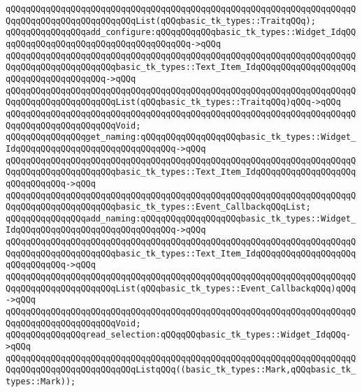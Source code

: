 \verb|qQQqqQQqqQQqqQQqqQQqqQQqqQQqqQQqqQQqqQQqqQQqqQQqqQQqqQQqqQQqqQQqqQQqqQQqqQQqqQQqqQQqqQQqqQQqqQQqList(qQQqbasic_tk_types::TraitqQQq);|\newline
\verb|qQQqqQQqqQQqqQQqadd_configure:qQQqqQQqqQQqbasic_tk_types::Widget_IdqQQqqQQqqQQqqQQqqQQqqQQqqQQqqQQqqQQqqQQq->qQQq|\newline
\verb|qQQqqQQqqQQqqQQqqQQqqQQqqQQqqQQqqQQqqQQqqQQqqQQqqQQqqQQqqQQqqQQqqQQqqQQqqQQqqQQqqQQqqQQqqQQqbasic_tk_types::Text_Item_IdqQQqqQQqqQQqqQQqqQQqqQQqqQQqqQQqqQQqqQQq->qQQq|\newline
\verb|qQQqqQQqqQQqqQQqqQQqqQQqqQQqqQQqqQQqqQQqqQQqqQQqqQQqqQQqqQQqqQQqqQQqqQQqqQQqqQQqqQQqqQQqqQQqList(qQQqbasic_tk_types::TraitqQQq)qQQq->qQQq|\newline
\verb|qQQqqQQqqQQqqQQqqQQqqQQqqQQqqQQqqQQqqQQqqQQqqQQqqQQqqQQqqQQqqQQqqQQqqQQqqQQqqQQqqQQqqQQqqQQqVoid;|\newline
\newline
\verb|qQQqqQQqqQQqqQQqget_naming:qQQqqQQqqQQqqQQqqQQqbasic_tk_types::Widget_IdqQQqqQQqqQQqqQQqqQQqqQQqqQQqqQQq->qQQq|\newline
\verb|qQQqqQQqqQQqqQQqqQQqqQQqqQQqqQQqqQQqqQQqqQQqqQQqqQQqqQQqqQQqqQQqqQQqqQQqqQQqqQQqqQQqqQQqqQQqbasic_tk_types::Text_Item_IdqQQqqQQqqQQqqQQqqQQqqQQqqQQqqQQq->qQQq|\newline
\verb|qQQqqQQqqQQqqQQqqQQqqQQqqQQqqQQqqQQqqQQqqQQqqQQqqQQqqQQqqQQqqQQqqQQqqQQqqQQqqQQqqQQqqQQqqQQqbasic_tk_types::Event_CallbackqQQqList;|\newline
\verb|qQQqqQQqqQQqqQQqadd_naming:qQQqqQQqqQQqqQQqqQQqbasic_tk_types::Widget_IdqQQqqQQqqQQqqQQqqQQqqQQqqQQqqQQq->qQQq|\newline
\verb|qQQqqQQqqQQqqQQqqQQqqQQqqQQqqQQqqQQqqQQqqQQqqQQqqQQqqQQqqQQqqQQqqQQqqQQqqQQqqQQqqQQqqQQqqQQqbasic_tk_types::Text_Item_IdqQQqqQQqqQQqqQQqqQQqqQQqqQQqqQQq->qQQq|\newline
\verb|qQQqqQQqqQQqqQQqqQQqqQQqqQQqqQQqqQQqqQQqqQQqqQQqqQQqqQQqqQQqqQQqqQQqqQQqqQQqqQQqqQQqqQQqqQQqList(qQQqbasic_tk_types::Event_CallbackqQQq)qQQq->qQQq|\newline
\verb|qQQqqQQqqQQqqQQqqQQqqQQqqQQqqQQqqQQqqQQqqQQqqQQqqQQqqQQqqQQqqQQqqQQqqQQqqQQqqQQqqQQqqQQqqQQqVoid;|\newline
\newline
\newline
\newline
\verb|qQQqqQQqqQQqqQQqread_selection:qQQqqQQqbasic_tk_types::Widget_IdqQQq->qQQq|\newline
\verb|qQQqqQQqqQQqqQQqqQQqqQQqqQQqqQQqqQQqqQQqqQQqqQQqqQQqqQQqqQQqqQQqqQQqqQQqqQQqqQQqqQQqqQQqqQQqqQQqListqQQq((basic_tk_types::Mark,qQQqbasic_tk_types::Mark));|\newline
